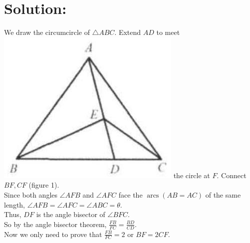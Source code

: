 \documentclass[10pt]{article}
\begin{document}
\section*{Solution:}
We draw the circumcircle of \(\triangle A B C\). Extend \(A D\) to meet\\
\includegraphics[max width=\textwidth]{2025_04_17_97bc1f7e44d93c271a88g-202(2)} the circle at \(F\). Connect \(B F, C F\) (figure 1).\\
Since both angles \(\angle A F B\) and \(\angle A F C\) face the \(\operatorname{arcs}(A B=A C)\) of the same length, \(\angle A F B=\angle A F C=\angle A B C=\theta\).\\
Thus, \(D F\) is the angle bisector of \(\angle B F C\).\\
So by the angle bisector theorem, \(\frac{F B}{F C}=\frac{B D}{C D}\).\\
Now we only need to prove that \(\frac{F B}{F C}=2\) or \(B F=2 C F\).\\
\end{document}
